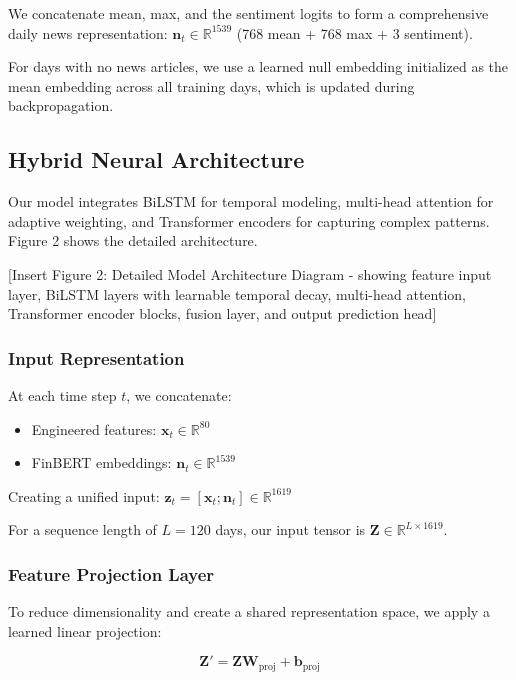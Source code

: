 \documentclass[conference]{IEEEtran}
\begin{document}
We concatenate mean, max, and the sentiment logits to form a comprehensive daily news representation: $\mathbf{n}_t \in \mathbb{R}^{1539}$ (768 mean + 768 max + 3 sentiment).

For days with no news articles, we use a learned null embedding initialized as the mean embedding across all training days, which is updated during backpropagation.

\subsection{Hybrid Neural Architecture}

Our model integrates BiLSTM for temporal modeling, multi-head attention for adaptive weighting, and Transformer encoders for capturing complex patterns. Figure 2 shows the detailed architecture.

[Insert Figure 2: Detailed Model Architecture Diagram - showing feature input layer, BiLSTM layers with learnable temporal decay, multi-head attention, Transformer encoder blocks, fusion layer, and output prediction head]

\subsubsection{Input Representation}
At each time step $t$, we concatenate:
\begin{itemize}
\item Engineered features: $\mathbf{x}_t \in \mathbb{R}^{80}$
\item FinBERT embeddings: $\mathbf{n}_t \in \mathbb{R}^{1539}$
\end{itemize}

Creating a unified input: $\mathbf{z}_t = [\mathbf{x}_t; \mathbf{n}_t] \in \mathbb{R}^{1619}$

For a sequence length of $L = 120$ days, our input tensor is $\mathbf{Z} \in \mathbb{R}^{L \times 1619}$.

\subsubsection{Feature Projection Layer}
To reduce dimensionality and create a shared representation space, we apply a learned linear projection:

\begin{equation}
\mathbf{Z}' = \mathbf{Z} \mathbf{W}_{\text{proj}} + \mathbf{b}_{\text{proj}}
\end{equation}
\end{document}
